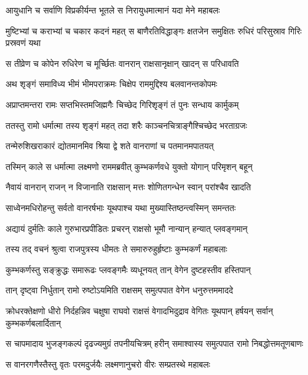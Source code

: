 \twolineshloka
{आयुधानि च सर्वाणि विप्रकीर्यन्त भूतले}
{स निरायुधमात्मानं यदा मेने महाबलः} %

\threelineshloka
{मुष्टिभ्यां च कराभ्यां च चकार कदनं महत्}
{स बाणैरतिविद्धाङ्गः क्षतजेन समुक्षितः}
{रुधिरं परिसुस्राव गिरिः प्रस्रवणं यथा} %

\twolineshloka
{स तीव्रेण च कोपेन रुधिरेण च मूर्च्छितः}
{वानरान् राक्षसानृक्षान् खादन् स परिधावति} %

\twolineshloka
{अथ शृङ्गं समाविध्य भीमं भीमपराक्रमः}
{चिक्षेप राममुद्दिश्य बलवानन्तकोपमः} %

\twolineshloka
{अप्राप्तमन्तरा रामः सप्तभिस्तमजिह्मगैः}
{चिच्छेद गिरिशृङ्गं तं पुनः सन्धाय कार्मुकम्} %

\twolineshloka
{ततस्तु रामो धर्मात्मा तस्य शृङ्गं महत् तदा}
{शरैः काञ्चनचित्राङ्गैश्चिच्छेद भरताग्रजः} %

\twolineshloka
{तन्मेरुशिखराकारं द्योतमानमिव श्रिया}
{द्वे शते वानराणां च पतमानमपातयत्} %

\twolineshloka
{तस्मिन् काले स धर्मात्मा लक्ष्मणो राममब्रवीत्}
{कुम्भकर्णवधे युक्तो योगान् परिमृशन् बहून्} %

\twolineshloka
{नैवायं वानरान् राजन् न विजानाति राक्षसान्}
{मत्तः शोणितगन्धेन स्वान् परांश्चैव खादति} %

\twolineshloka
{साध्वेनमधिरोहन्तु सर्वतो वानरर्षभाः}
{यूथपाश्च यथा मुख्यास्तिष्ठन्त्वस्मिन् समन्ततः} %

\twolineshloka
{अद्यायं दुर्मतिः काले गुरुभारप्रपीडितः}
{प्रचरन् राक्षसो भूमौ नान्यान् हन्यात् प्लवङ्गमान्} %

\twolineshloka
{तस्य तद् वचनं श्रुत्वा राजपुत्रस्य धीमतः}
{ते समारुरुहुर्हृष्टाः कुम्भकर्णं महाबलाः} %

\twolineshloka
{कुम्भकर्णस्तु सङ्क्रुद्धः समारूढः प्लवङ्गमैः}
{व्यधूनयत् तान् वेगेन दुष्टहस्तीव हस्तिपान्} %

\twolineshloka
{तान् दृष्ट्वा निर्धुतान् रामो रुष्टोऽयमिति राक्षसम्}
{समुत्पपात वेगेन धनुरुत्तममाददे} %

\threelineshloka
{क्रोधरक्तेक्षणो धीरो निर्दहन्निव चक्षुषा}
{राघवो राक्षसं वेगादभिदुद्राव वेगितः}
{यूथपान् हर्षयन् सर्वान् कुम्भकर्णबलार्दितान्} %

\twolineshloka
{स चापमादाय भुजङ्गकल्पं दृढज्यमुग्रं तपनीयचित्रम्}
{हरीन् समाश्वास्य समुत्पपात रामो निबद्धोत्तमतूणबाणः} %

\twolineshloka
{स वानरगणैस्तैस्तु वृतः परमदुर्जयैः}
{लक्ष्मणानुचरो वीरः सम्प्रतस्थे महाबलः} %


